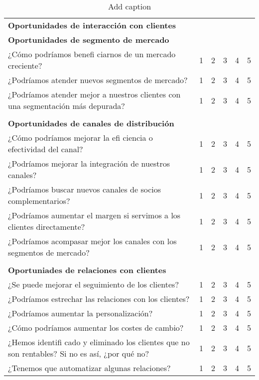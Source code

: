 \documentclass[11pt]{book}
\begin{document}
\begin{table}[htbp]
  \centering
  \caption{Add caption}
    \begin{tabular}{p{27.93em}rrrrr}
    \textcolor[rgb]{ 1,  0,  0}{\textbf{Oportunidades de interacción con clientes}} &       &       &       &       &  \\
    \textbf{Oportunidades de segmento de mercado} &       &       &       &       &  \\
    ¿Cómo podríamos benefi ciarnos de un mercado creciente? & 1     & 2     & 3     & 4     & 5 \\
    ¿Podríamos atender nuevos segmentos de mercado? & 1     & 2     & 3     & 4     & 5 \\
    ¿Podríamos atender mejor a nuestros clientes con una segmentación más depurada? & 1     & 2     & 3     & 4     & 5 \\
    \multicolumn{1}{l}{} &       &       &       &       &  \\
    \textbf{Oportunidades de canales de distribución} &       &       &       &       &  \\
    ¿Cómo podríamos mejorar la efi ciencia o efectividad del canal? & 1     & 2     & 3     & 4     & 5 \\
    ¿Podríamos mejorar la integración de nuestros canales? & 1     & 2     & 3     & 4     & 5 \\
    ¿Podríamos buscar nuevos canales de socios complementarios? & 1     & 2     & 3     & 4     & 5 \\
    ¿Podríamos aumentar el margen si servimos a los clientes directamente? & 1     & 2     & 3     & 4     & 5 \\
    ¿Podríamos acompasar mejor los canales con los segmentos de mercado? & 1     & 2     & 3     & 4     & 5 \\
    \multicolumn{1}{l}{} &       &       &       &       &  \\
    \textbf{Oportuniades de relaciones con clientes} &       &       &       &       &  \\
    ¿Se puede mejorar el seguimiento de los clientes? & 1     & 2     & 3     & 4     & 5 \\
    ¿Podríamos estrechar las relaciones con los clientes? & 1     & 2     & 3     & 4     & 5 \\
    ¿Podríamos aumentar la personalización? & 1     & 2     & 3     & 4     & 5 \\
    ¿Cómo podríamos aumentar los costes de cambio? & 1     & 2     & 3     & 4     & 5 \\
    ¿Hemos identifi cado y eliminado los clientes que no son rentables? Si no es así, ¿por qué no? & 1     & 2     & 3     & 4     & 5 \\
    ¿Tenemos que automatizar algunas relaciones? & 1     & 2     & 3     & 4     & 5 \\
    \end{tabular}%
  \label{tab:addlabel}%
\end{table}%
\end{document}
